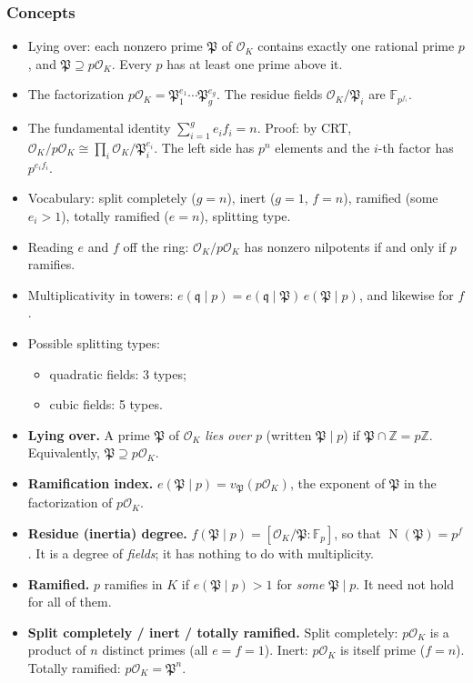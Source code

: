 \documentclass[11pt]{article}
\newcommand{\Z}{\mathbb{Z}}
\newcommand{\F}{\mathbb{F}}
\newcommand{\OK}{\mathcal{O}_K}
\newcommand{\fP}{\mathfrak{P}}
\newcommand{\fq}{\mathfrak{q}}
\DeclareMathOperator{\Nm}{N}
\begin{document}
\subsubsection*{Concepts}
\begin{itemize}
  \item Lying over: each nonzero prime $\fP$ of $\OK$ contains exactly one rational prime $p$, and $\fP\supseteq p\OK$. Every $p$ has at least one prime above it.
  \item The factorization $p\OK=\fP_1^{e_1}\cdots\fP_g^{e_g}$. The residue fields $\OK/\fP_i$ are $\F_{p^{f_i}}$.
  \item The fundamental identity $\sum_{i=1}^g e_if_i=n$. Proof: by CRT, $\OK/p\OK\cong\prod_i\OK/\fP_i^{e_i}$. The left side has $p^n$ elements and the $i$-th factor has $p^{e_if_i}$.
  \item Vocabulary: split completely ($g=n$), inert ($g=1$, $f=n$), ramified (some $e_i>1$), totally ramified ($e=n$), splitting type.
  \item Reading $e$ and $f$ off the ring: $\OK/p\OK$ has nonzero nilpotents if and only if $p$ ramifies.
  \item Multiplicativity in towers: $e(\fq\mid p)=e(\fq\mid\fP)\,e(\fP\mid p)$, and likewise for $f$.
  \item Possible splitting types:
  \begin{itemize}
    \item quadratic fields: 3 types;
    \item cubic fields: 5 types.
  \end{itemize}
\end{itemize}

\begin{keydefs}
\begin{itemize}
  \item \textbf{Lying over.} A prime $\fP$ of $\OK$ \emph{lies over} $p$ (written $\fP\mid p$) if $\fP\cap\Z=p\Z$. Equivalently, $\fP\supseteq p\OK$.
  \item \textbf{Ramification index.} $e(\fP\mid p)=v_\fP(p\OK)$, the exponent of $\fP$ in the factorization of $p\OK$.
  \item \textbf{Residue (inertia) degree.} $f(\fP\mid p)=[\OK/\fP:\F_p]$, so that $\Nm(\fP)=p^{f}$. It is a degree of \emph{fields}; it has nothing to do with multiplicity.
  \item \textbf{Ramified.} $p$ ramifies in $K$ if $e(\fP\mid p)>1$ for \emph{some} $\fP\mid p$. It need not hold for all of them.
  \item \textbf{Split completely / inert / totally ramified.} Split completely: $p\OK$ is a product of $n$ distinct primes (all $e=f=1$). Inert: $p\OK$ is itself prime ($f=n$). Totally ramified: $p\OK=\fP^n$.
\end{itemize}
\end{keydefs}
\end{document}
